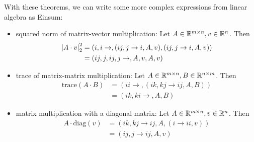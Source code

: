 

With these theorems, we can write some more complex expressions from linear algebra as Einsum:
\begin{itemize}
    \item squared norm of matrix-vector multiplication: Let $A \in \mathbb{R}^{m \times n}, v \in \mathbb{R}^{n}$. Then
          \begin{align*}
              \left| A \cdot v \right|_2^2 & = (i,i\rightarrow,(ij, j \rightarrow i, A, v),(ij, j \rightarrow i, A, v)) \\
                                  & = (ij,j,ij,j\rightarrow,A,v,A,v)
          \end{align*}
    \item trace of matrix-matrix multiplication: Let $A \in \mathbb{R}^{m \times n}, B \in \mathbb{R}^{n \times m}$. Then
          \begin{align*}
              \text{trace}(A \cdot B) & = (ii \rightarrow, (ik, kj \rightarrow ij, A, B)) \\
                                      & = (ik, ki \rightarrow, A, B)
          \end{align*}
    \item matrix multiplication with a diagonal matrix: Let $A \in \mathbb{R}^{m \times n}, v \in \mathbb{R}^{n}$. Then
          \begin{align*}
              A \cdot \text{diag}(v) & = (ik, kj \rightarrow ij, A, (i \rightarrow ii, v)) \\
                                     & = (ij, j \rightarrow ij, A, v)                      \\
          \end{align*}
\end{itemize}


